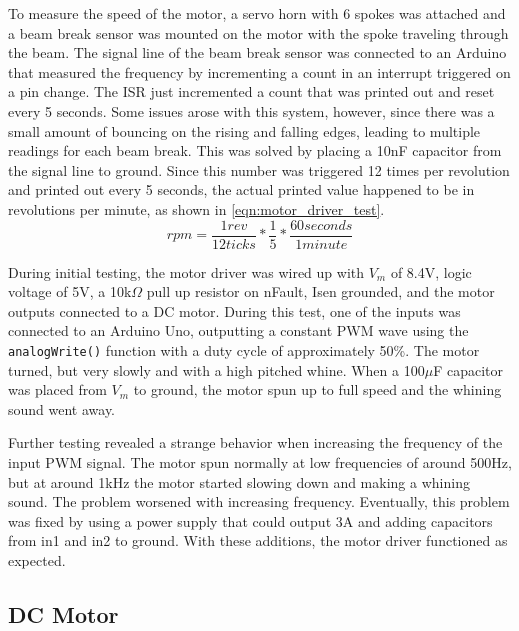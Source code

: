 To measure the speed of the motor, a servo horn with 6 spokes was attached and a beam break sensor was mounted on the motor with the spoke traveling through the beam. The signal line of the beam break sensor was connected to an Arduino that measured the frequency by incrementing a count in an interrupt triggered on a pin change. The ISR just incremented a count that was printed out and reset every 5 seconds. Some issues arose with this system, however, since there was a small amount of bouncing on the rising and falling edges, leading to multiple readings for each beam break. This was solved by placing a 10nF capacitor from the signal line to ground. Since this number was triggered 12 times per revolution and printed out every 5 seconds, the actual printed value happened to be in revolutions per minute, as shown in \ref{eqn:motor_driver_test}.
\begin{equation}
rpm = \frac{1 rev}{12 ticks} * \frac{1}{5} * \frac{60 seconds}{1 minute}
\label{eqn:motor_driver_test}
\end{equation}

During initial testing, the motor driver was wired up with $V_m$ of 8.4V, logic voltage of 5V, a 10k$\Omega$ pull up resistor on nFault, Isen grounded, and the motor outputs connected to a DC motor. During this test, one of the inputs was connected to an Arduino Uno, outputting a constant PWM wave using the \texttt{analogWrite()} function with a duty cycle of approximately 50\%. The motor turned, but very slowly and with a high pitched whine. When a 100$\mu$F capacitor was placed from $V_m$ to ground, the motor spun up to full speed and the whining sound went away.

Further testing revealed a strange behavior when increasing the frequency of the input PWM signal. The motor spun normally at low frequencies of around 500Hz, but at around 1kHz the motor started slowing down and making a whining sound. The problem worsened with increasing frequency. Eventually, this problem was fixed by using a power supply that could output 3A and adding capacitors from in1 and in2 to ground. With these additions, the motor driver functioned as expected.

\subsection{DC Motor}

